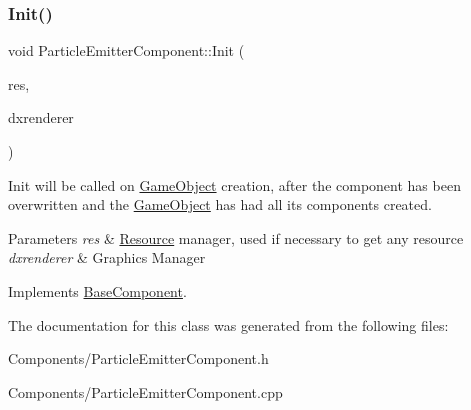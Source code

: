 \mbox{\label{classParticleEmitterComponent_ace8b753108a862794dacc0455707d791}} 
\subsubsection{\texorpdfstring{Init()}{Init()}}
{\footnotesize\ttfamily void Particle\+Emitter\+Component\+::\+Init (\begin{DoxyParamCaption}\item[{\hyperlink{classResourceManager}{Resource\+Manager} $\ast$}]{res,  }\item[{\hyperlink{classDXRenderer}{D\+X\+Renderer} $\ast$}]{dxrenderer }\end{DoxyParamCaption})\hspace{0.3cm}{\ttfamily [virtual]}}



Init will be called on \hyperlink{classGameObject}{Game\+Object} creation, after the component has been overwritten and the \hyperlink{classGameObject}{Game\+Object} has had all its components created. 


\begin{DoxyParams}{Parameters}
{\em res} & \hyperlink{structResource}{Resource} manager, used if necessary to get any resource \\
\hline
{\em dxrenderer} & Graphic\textquotesingle{}s Manager \\
\hline
\end{DoxyParams}


Implements \hyperlink{classBaseComponent}{Base\+Component}.



The documentation for this class was generated from the following files\+:\begin{DoxyCompactItemize}
\item 
Components/Particle\+Emitter\+Component.\+h\item 
Components/Particle\+Emitter\+Component.\+cpp\end{DoxyCompactItemize}
